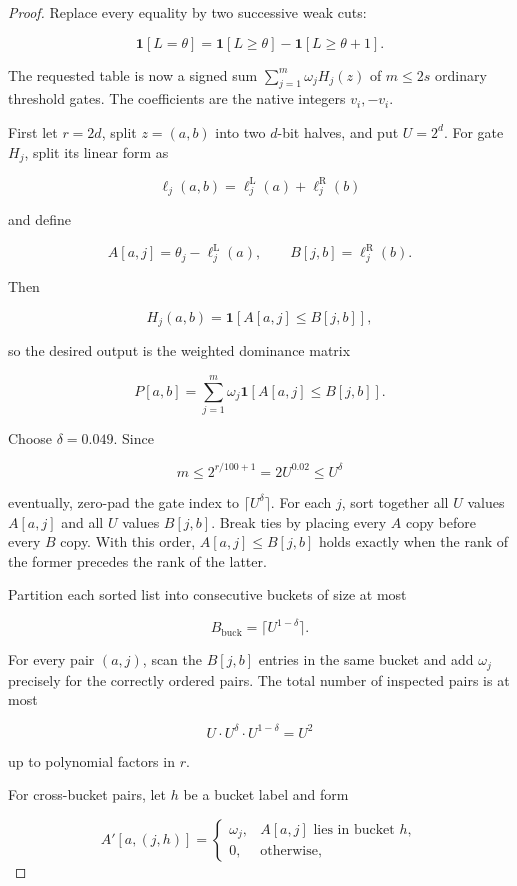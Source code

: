 \documentclass[11pt,letterpaper]{article}
\theoremstyle{definition}
\theoremstyle{remark}
\begin{document}
\begin{proof} Replace every equality by two successive weak cuts:

\[
\mathbf1[L=\theta]
{}={}
\mathbf1[L\ge\theta]
{}-{}
\mathbf1[L\ge\theta+1].
\tag{B.2}
\]

The requested table is now a signed sum \(\sum_{j=1}^m\omega_jH_j(z)\)
of \(m\le2s\) ordinary threshold gates. The coefficients are the native
integers \(v_i,-v_i\).

First let \(r=2d\), split \(z=(a,b)\) into two \(d\)-bit halves, and put
\(U=2^d\). For gate \(H_j\), split its linear form as

\[
\ell_j(a,b)
{}={}
\ell_j^{\mathrm L}(a)
{}+{}
\ell_j^{\mathrm R}(b)
\]

and define

\[
A[a,j]
{}={}
\theta_j-\ell_j^{\mathrm L}(a),
\qquad
B[j,b]
{}={}
\ell_j^{\mathrm R}(b).
\]

Then

\[
H_j(a,b)=\mathbf1[A[a,j]\le B[j,b]],
\]

so the desired output is the weighted dominance matrix

\[
P[a,b]
{}={}
\sum_{j=1}^m
\omega_j\mathbf1[A[a,j]\le B[j,b]].
\tag{B.3}
\]

Choose \(\delta=0.049\). Since

\[
m
\le
2^{r/100+1}
{}={}
2U^{0.02}
\le
U^\delta
\]

eventually, zero-pad the gate index to \(\lceil U^\delta\rceil\). For
each \(j\), sort together all \(U\) values \(A[a,j]\) and all \(U\)
values \(B[j,b]\). Break ties by placing every \(A\) copy before every
\(B\) copy. With this order, \(A[a,j]\le B[j,b]\) holds exactly when the
rank of the former precedes the rank of the latter.

Partition each sorted list into consecutive buckets of size at most

\[
B_{\mathrm{buck}}
{}={}
\lceil U^{1-\delta}\rceil.
\]

For every pair \((a,j)\), scan the \(B[j,b]\) entries in the same bucket
and add \(\omega_j\) precisely for the correctly ordered pairs. The
total number of inspected pairs is at most

\[
U\cdot U^\delta\cdot U^{1-\delta}
{}={}
U^2
\]

up to polynomial factors in \(r\).

For cross-bucket pairs, let \(h\) be a bucket label and form

\[
A'[a,(j,h)]
{}={}
\begin{cases}
\omega_j,&A[a,j]\text{ lies in bucket }h,\\
0,&\text{otherwise},
\end{cases}
\]


\end{proof}
\end{document}
